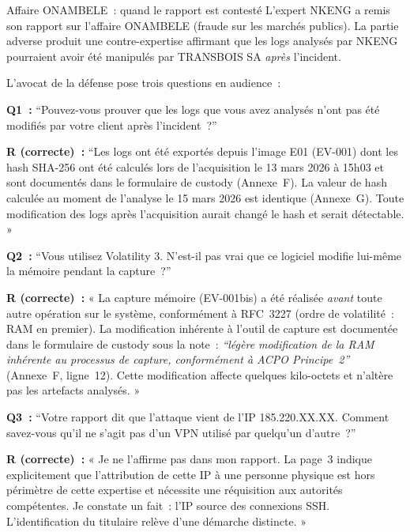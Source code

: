 \begin{boxscenario}{Affaire ONAMBELE~: quand le rapport est contesté}
L'expert NKENG a remis son rapport sur l'affaire ONAMBELE (fraude
sur les marchés publics). La partie adverse produit une contre-expertise
affirmant que les logs analysés par NKENG pourraient avoir été
manipulés par TRANSBOIS SA \emph{après} l'incident.

L'avocat de la défense pose trois questions en audience~:

\textbf{Q1~:} ``Pouvez-vous prouver que les logs que vous avez
analysés n'ont pas été modifiés par votre client après l'incident~?''

\textbf{R (correcte)~:} ``Les logs ont été exportés depuis l'image
E01 (EV-001) dont les hash SHA-256 ont été calculés lors de
l'acquisition le 13 mars 2026 à 15h03 et sont documentés dans
le formulaire de custody (Annexe~F). La valeur de hash calculée
au moment de l'analyse le 15 mars 2026 est identique (Annexe~G).
Toute modification des logs après l'acquisition aurait changé
le hash et serait détectable. »

\textbf{Q2~:} ``Vous utilisez Volatility 3. N'est-il pas vrai que
ce logiciel modifie lui-même la mémoire pendant la capture~?''

\textbf{R (correcte)~:} « La capture mémoire (EV-001bis) a été
réalisée \emph{avant} toute autre opération sur le système, conformément
à RFC~3227 (ordre de volatilité~: RAM en premier). La modification
inhérente à l'outil de capture est documentée dans le formulaire
de custody sous la note~: \textit{``légère modification de la RAM
inhérente au processus de capture, conformément à ACPO Principe~2''}
(Annexe~F, ligne~12). Cette modification affecte quelques kilo-octets
et n'altère pas les artefacts analysés. »

\textbf{Q3~:} ``Votre rapport dit que l'attaque vient de l'IP
185.220.XX.XX. Comment savez-vous qu'il ne s'agit pas d'un VPN
utilisé par quelqu'un d'autre~?''

\textbf{R (correcte)~:} « Je ne l'affirme pas dans mon rapport.
La page~3 indique explicitement que l'attribution de cette IP à une
personne physique est hors périmètre de cette expertise et nécessite
une réquisition aux autorités compétentes. Je constate un fait~:
l'IP source des connexions SSH. L'identification du titulaire relève
d'une démarche distincte. »
\end{boxscenario}

\separateur

